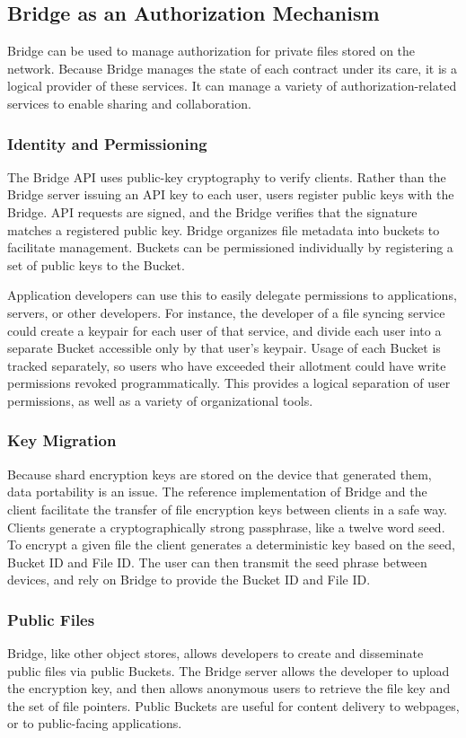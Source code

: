 \documentclass[a4paper,10pt]{article}
\begin{document}
\subsection{Bridge as an Authorization Mechanism}
Bridge can be used to manage authorization for private files stored on the network. Because Bridge manages the state of each contract under its care, it is a logical provider of these services. It can manage a variety of authorization-related services to enable sharing and collaboration.

\subsubsection{Identity and Permissioning}
The Bridge API uses public-key cryptography to verify clients. Rather than the Bridge server issuing an API key to each user, users register public keys with the Bridge. API requests are signed, and the Bridge verifies that the signature matches a registered public key. Bridge organizes file metadata into buckets to facilitate management. Buckets can be permissioned individually by registering a set of public keys to the Bucket.

Application developers can use this to easily delegate permissions to applications, servers, or  other developers. For instance, the developer of a file syncing service could create a keypair for each user of that service, and divide each user into a separate Bucket accessible only by that user’s keypair. Usage of each Bucket is tracked separately, so users who have exceeded their allotment could have write permissions revoked programmatically. This provides a logical separation of user permissions, as well as a variety of organizational tools.

\subsubsection{Key Migration}
Because shard encryption keys are stored on the device that generated them, data portability is an issue. The reference implementation of Bridge and the client facilitate the transfer of file encryption keys between clients in a safe way. Clients generate a cryptographically strong passphrase, like a twelve word seed. To encrypt a given file the client generates a deterministic key based on the seed, Bucket ID and File ID. The user can then transmit the seed phrase between devices, and rely on Bridge to provide the Bucket ID and File ID.

\subsubsection{Public Files}
Bridge, like other object stores, allows developers to create and disseminate public files via public Buckets. The Bridge server allows the developer to upload the encryption key, and then allows anonymous users to retrieve the file key and the set of file pointers. Public Buckets are useful for content delivery to webpages, or to public-facing applications.
\end{document}
